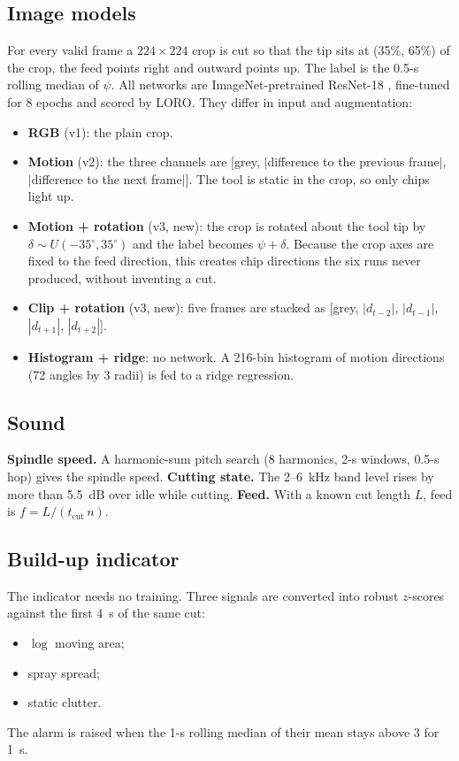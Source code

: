 \documentclass[conference,a4paper]{IEEEtran}
\newcommand{\degr}{\ensuremath{^\circ}}
\begin{document}
\subsection{Image models}\label{sec:m-cnn}
For every valid frame a $224\times224$ crop is cut so that the tip sits at (35\%, 65\%) of the crop, the feed points right and outward points up.
The label is the 0.5-s rolling median of $\psi$.
All networks are ImageNet-pretrained ResNet-18 \cite{he2016}, fine-tuned for 8 epochs and scored by LORO.
They differ in input and augmentation:
\begin{itemize}
\item \textbf{RGB} (v1): the plain crop.
\item \textbf{Motion} (v2): the three channels are [grey, $|$difference to the previous frame$|$, $|$difference to the next frame$|$]. The tool is static in the crop, so only chips light up.
\item \textbf{Motion + rotation} (v3, new): the crop is rotated about the tool tip by $\delta\sim U(-35\degr,35\degr)$ and the label becomes $\psi+\delta$. Because the crop axes are fixed to the feed direction, this creates chip directions the six runs never produced, without inventing a cut.
\item \textbf{Clip + rotation} (v3, new): five frames are stacked as [grey, $|d_{t-2}|$, $|d_{t-1}|$, $|d_{t+1}|$, $|d_{t+2}|$].
\item \textbf{Histogram + ridge}: no network. A 216-bin histogram of motion directions (72 angles by 3 radii) is fed to a ridge regression.
\end{itemize}

\subsection{Sound}
\textbf{Spindle speed.} A harmonic-sum pitch search (8 harmonics, 2-s windows, 0.5-s hop) gives the spindle speed.
\textbf{Cutting state.} The 2--\SI{6}{kHz} band level rises by more than \SI{5.5}{dB} over idle while cutting.
\textbf{Feed.} With a known cut length $L$, feed is $f=L/(t_\mathrm{cut}\,n)$.

\subsection{Build-up indicator}
The indicator needs no training.
Three signals are converted into robust $z$-scores against the first \SI{4}{s} of the same cut:
\begin{itemize}
\item $\log$ moving area;
\item spray spread;
\item static clutter.
\end{itemize}
The alarm is raised when the 1-s rolling median of their mean stays above 3 for \SI{1}{s}.
\end{document}
